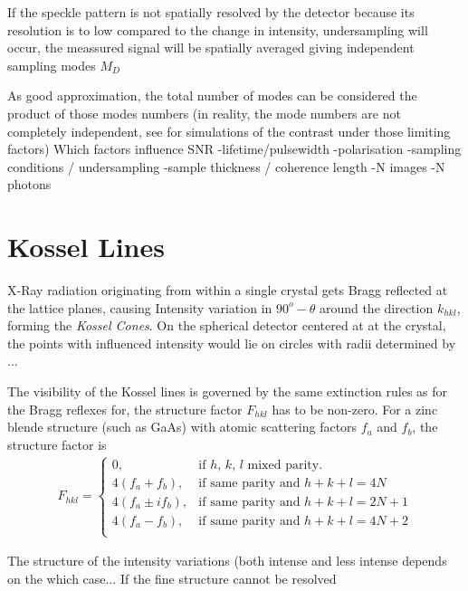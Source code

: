 If the speckle pattern is not spatially resolved by the detector because its resolution is to low compared to the change in intensity, undersampling will occur, the meassured signal will be spatially averaged giving independent sampling modes $M_D$





As good approximation, the total number of modes can be considered the product of those modes numbers (in reality, the mode numbers are not completely independent, see  for simulations of the contrast under those limiting factors)
Which factors influence SNR
-lifetime/pulsewidth
-polarisation
-sampling conditions / undersampling
-sample thickness / coherence length
-N images
-N photons
\label{chap:theory}




\section{Kossel Lines}
X-Ray radiation originating from within a single crystal gets Bragg reflected at the lattice planes, causing Intensity variation in $90^o-\theta$ around the direction $k_{hkl}$, forming the \textit{Kossel Cones}. On the spherical detector centered at at the crystal, the points with influenced intensity would lie on circles with radii determined by ...

The visibility of the Kossel lines is governed by the same extinction rules as for the Bragg reflexes for, the structure factor $F_{hkl}$ has to be non-zero. For a zinc blende structure (such as GaAs) with atomic scattering factors $f_a$ and $f_b$, the structure factor is
\begin{align}
F_{hkl} = \begin{cases}
0, & \text{if $h$, $k$, $l$ mixed parity}.\\
4(f_a+f_b), & \text{if same parity and $h+k+l = 4 N$} \\
4(f_a\pm i f_b), & \text{if same parity and $h+k+l = 2 N+1$} \\
4(f_a-f_b), & \text{if same parity and $h+k+l = 4 N+2$} \\
\end{cases}
\end{align}

The structure of the intensity variations (both intense and less intense depends on the which case...
If the fine structure cannot be resolved

